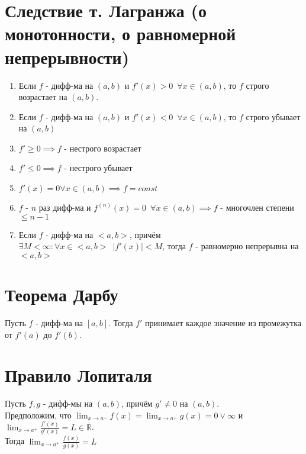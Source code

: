 \documentclass[11pt, a4paper]{article}
\def\R{\mathbb{R}}
\def\sp{\, \, \,}
\def\ds{\displaystyle}
\begin{document}
    \section{Следствие т. Лагранжа (о монотонности, о равномерной непрерывности)}
    \begin{enumerate}
        \item Если $f$ - дифф-ма на $(a,b)$ и $f'(x) > 0 \sp \forall x \in (a,b)$, то $f$ строго возрастает на $(a,b)$.
        \item Если $f$ - дифф-ма на $(a, b)$ и $f'(x) < 0 \sp \forall x \in (a,b)$, то $f$ строго убывает на $(a, b)$
        \item $f' \geq 0 \implies f$ - нестрого возрастает
        \item $f' \leq 0 \implies f$ - нестрого убывает
        \item $f'(x) = 0 \forall x \in (a,b) \implies f = const$
        \item $f$ - $n$ раз дифф-ма и $f^{(n)}(x) = 0 \sp \forall x \in (a,b) \implies f$ - многочлен степени $\leq n-1$
        \item Если $f$ - дифф-ма на $<a, b>$, причём $\exists M < \infty: \forall x \in <a,b> \sp |f'(x)| < M$, тогда $f$ - равномерно непрерывна на $<a, b>$
    \end{enumerate}

    \section{Теорема Дарбу}
    Пусть $f$ - дифф-ма на $[a, b]$. Тогда $f'$ принимает каждое значение из промежутка от $f'(a)$ до $f'(b)$.

    \section{Правило Лопиталя}
    Пусть $f, g$ - дифф-мы на $(a,b)$, причём $g' \neq 0$ на $(a,b)$.\\
    Предположим, что $\ds \lim_{x \to a^+} f(x) = \lim_{x \to a^+} g(x) = 0 \lor \infty$ и $\ds \lim_{x \to a^+} \frac{f'(x)}{g'(x)} = L \in \overline{\R}$.\\
    Тогда $\ds \lim_{x \to a^+} \frac{f(x)}{g(x)} = L$
\end{document}
